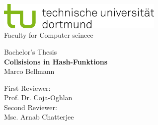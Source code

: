 \begin{titlepage}
    \vspace*{-2cm}
    \newlength{\links}
    \setlength{\links}{-1.5cm}
    \sffamily
    \hspace*{\links}
    \begin{minipage}{12.5cm}
        \includegraphics[width=8cm]{bilder/tud_logo_rgb}\\
        Faculty for Computer scinece 

    \end{minipage}

    \vspace*{4cm}

    \hspace*{\links}
    \hspace*{-0.2cm}
        \large
        \begin{center}
            {\Large Bachelor's Thesis} \\
            \vspace*{0.5cm}
            {\LARGE
            \textbf{Collsisions in Hash-Funktions} \\
            }
            \vspace*{0.5cm}
            Marco Bellmann\\
        \end{center}
    \normalsize
    \vspace*{7.5cm}



    \hspace*{\links}
        \center
        First Reviewer: \\
        Prof. Dr. Coja-Oghlan \\
        \vspace*{0.5cm}
        Second Reviewer: \\
        Msc. Arnab Chatterjee \\


\end{titlepage}
